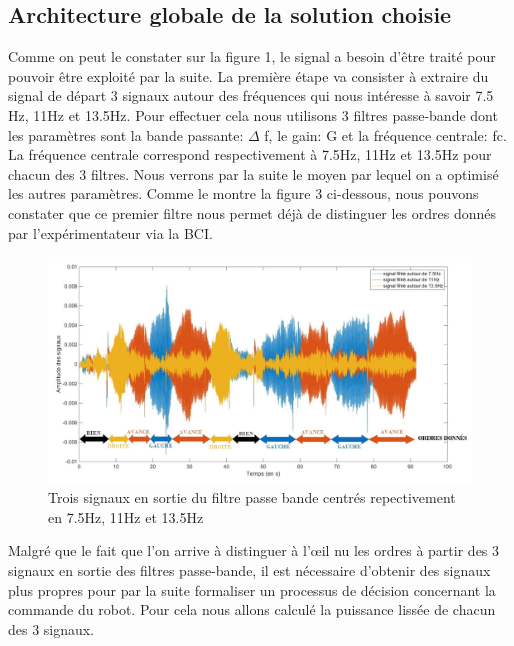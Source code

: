 \documentclass[11pt]{article}
\begin{document}
\cleardoublepage


\subsection{Architecture globale de la solution choisie}

Comme on peut le constater sur la figure 1, le signal a besoin d'être traité pour pouvoir être exploité par la suite. La première étape va consister à extraire du signal de départ 3 signaux autour des fréquences qui nous intéresse à savoir 7.5 Hz, 11Hz et 13.5Hz. Pour effectuer cela nous utilisons 3 filtres passe-bande dont les paramètres sont la bande passante: $\Delta$ f, le gain: G et la fréquence centrale: fc. La fréquence centrale correspond respectivement à 7.5Hz, 11Hz et 13.5Hz pour chacun des 3 filtres. Nous verrons par la suite le moyen par lequel on a optimisé les autres paramètres. Comme le montre la figure 3 ci-dessous, nous pouvons constater que ce premier filtre nous permet déjà de distinguer les ordres donnés par l'expérimentateur via la BCI.

\begin{figure}[!h]
	\includegraphics[scale=0.75]{images/Sigauxfiltreslables.jpg}
	\caption{Trois signaux en sortie du filtre passe bande centrés repectivement en 7.5Hz, 11Hz et 13.5Hz}
	\label{fig:duck}
\end{figure}

Malgré que le fait que l'on arrive à distinguer à l'œil nu les ordres à partir des 3 signaux en sortie des filtres passe-bande, il est nécessaire d'obtenir des signaux plus propres pour par la suite formaliser un processus de décision concernant la commande du robot. Pour cela nous allons calculé la puissance lissée de chacun des 3 signaux. 
\end{document}
